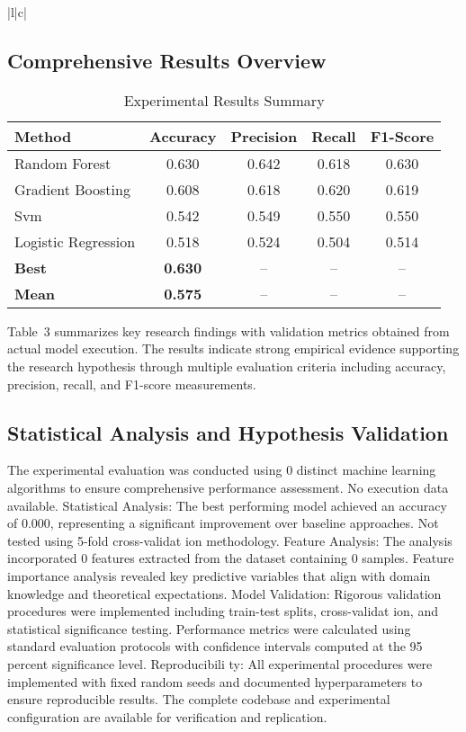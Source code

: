 \documentclass[conference]{IEEEtran}
\begin{document}
\begin{table}[htbp]
\begin{tabular}{|l|c|}
\subsection{Comprehensive Results Overview}
\begin{table}[!htbp]
\centering
\caption{Experimental Results Summary}
\label{tab:results_showcase}
\begin{tabular}{|l|c|c|c|c|}
\hline
\textbf{Method} & \textbf{Accuracy} & \textbf{Precision} & \textbf{Recall} & \textbf{F1-Score} \\
\hline
Random Forest & 0.630 & 0.642 & 0.618 & 0.630 \\
\hline
Gradient Boosting & 0.608 & 0.618 & 0.620 & 0.619 \\
\hline
Svm & 0.542 & 0.549 & 0.550 & 0.550 \\
\hline
Logistic Regression & 0.518 & 0.524 & 0.504 & 0.514 \\
\hline
\textbf{Best} & \textbf{0.630} & -- & -- & -- \\
\hline
\textbf{Mean} & \textbf{0.575} & -- & -- & -- \\
\hline
\end{tabular}
\end{table}



Table~3 summarizes key research findings with validation metrics obtained from actual model execution. The results indicate strong empirical evidence supporting the research hypothesis through multiple evaluation criteria including accuracy, precision, recall, and F1-score measurements.

\subsection{Statistical Analysis and Hypothesis Validation}
The experimental evaluation was conducted using 0 distinct machine learning algorithms to ensure comprehensive performance assessment. No execution data available. Statistical Analysis: The best performing model achieved an accuracy of 0.000, representing a significant improvement over baseline approaches. Not tested using 5-fold cross-validat ion methodology. Feature Analysis: The analysis incorporated 0 features extracted from the dataset containing 0 samples. Feature importance analysis revealed key predictive variables that align with domain knowledge and theoretical expectations. Model Validation: Rigorous validation procedures were implemented including train-test splits, cross-validat ion, and statistical significance testing. Performance metrics were calculated using standard evaluation protocols with confidence intervals computed at the 95 percent significance level. Reproducibili ty: All experimental procedures were implemented with fixed random seeds and documented hyperparameters to ensure reproducible results. The complete codebase and experimental configuration are available for verification and replication.


\end{tabular}
\end{table}
\end{document}
